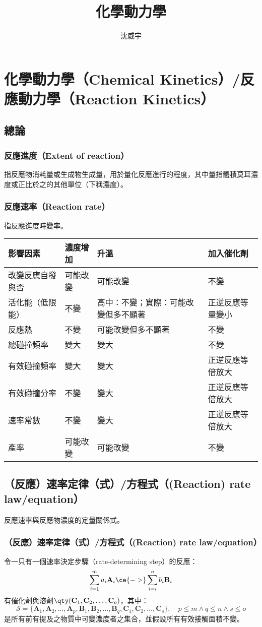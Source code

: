 \documentclass[a4paper,12pt]{article}
\begin{document}
\title{化學動力學}
\author{沈威宇}
\date{\temtoday}
\titletocdoc
\section{化學動力學（Chemical Kinetics）/反應動力學（Reaction Kinetics）}
\subsection{總論}
\subsubsection{反應進度（Extent of reaction）}
指反應物消耗量或生成物生成量，用於量化反應進行的程度，其中量指體積莫耳濃度或正比於之的其他單位（下稱濃度）。
\subsubsection{反應速率（Reaction rate）}
指反應進度時變率。
\begin{longtable}[c]{|p{}|p{}|p{}|p{}|}
\hline
影響因素 & 濃度增加 & 升溫 & 加入催化劑 \\ \hline
改變反應自發與否 & 可能改變 & 可能改變 & 不變 \\ \hline
活化能（低限能） & 不變 & 高中：不變；實際：可能改變但多不顯著 & 正逆反應等量變小 \\ \hline
反應熱 & 不變 & 可能改變但多不顯著 & 不變 \\ \hline
總碰撞頻率 & 變大 & 變大 & 不變 \\ \hline
有效碰撞頻率 & 變大 & 變大 & 正逆反應等倍放大 \\ \hline
有效碰撞分率 & 不變 & 變大 & 正逆反應等倍放大 \\ \hline
速率常數 & 不變 & 變大 & 正逆反應等倍放大 \\ \hline
產率 & 可能改變 & 可能改變 & 不變 \\ \hline
\end{longtable}\FB
\subsection{（反應）速率定律（式）/方程式（(Reaction) rate law/equation）}
反應速率與反應物濃度的定量關係式。
\subsubsection{（反應）速率定律（式）/方程式（(Reaction) rate law/equation）}
令一只有一個速率決定步驟（rate-determining step）的反應：
\[\sum_{i=1}^ma_i\mathbf{A}_i\ce{->}\sum_{i=i}^nb_i\mathbf{B}_i\]
有催化劑與溶劑$\qty(\mathbf{C}_1,\mathbf{C}_2,\ldots,\mathbf{C}_o)$，其中：
\[\mathscr{S}=\{\mathbf{A}_1,\mathbf{A}_2,\ldots,\mathbf{A}_p,\mathbf{B}_1,\mathbf{B}_2,\ldots,\mathbf{B}_q,\mathbf{C}_1,\mathbf{C}_2,\ldots,\mathbf{C}_s\},\quad p\leq m\land q\leq n\land s\leq o\]
是所有前有提及之物質中可變濃度者之集合，並假設所有有效接觸面積不變。
\end{document}
